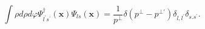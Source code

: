 \begin{equation}
\int\rho d\rho d\varphi \Psi _{l^{\prime }s^{\prime }}^{\dagger }(\mathbf{x}%
)\Psi _{ls}(\mathbf{x})=\frac{1}{p^{\bot }}\delta \left( p^{\bot }-p^{\bot
\prime }\right) \delta _{l,l^{\prime }}\delta _{s.s^{\prime }}.
\end{equation}

